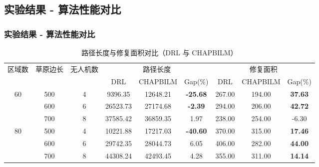 \documentclass[10pt, aspectratio=169]{beamer}  %
\begin{document}
\subsection{实验结果 - 算法性能对比}
\begin{frame}
	\frametitle{实验结果 - 算法性能对比}
	\begin{table}
		\centering
		\caption{路径长度与修复面积对比（DRL 与 CHAPBILM）}
		\small %
		\setlength{\tabcolsep}{3pt}
		\begin{tabular}{ccc ccc ccc}
			\toprule
			\multirow{2}{*}{区域数} & \multirow{2}{*}{草原边长} & \multirow{2}{*}{ 无人机数} & \multicolumn{3}{c}{路径长度} & \multicolumn{3}{c}{修复面积}                                                        \\
			\cmidrule(lr){4-6}\cmidrule(lr){7-9}
			                     &                       &                        & DRL                      & CHAPBILM                 & Gap(\%)         & DRL    & CHAPBILM & Gap(\%)        \\
			\midrule
			\multirow{3}{*}{60}
			                     & 500                   & 4                      & 9396.35                  & 12648.21                 & \textbf{-25.68} & 267.00 & 194.00   & \textbf{37.63} \\
			                     & 600                   & 6                      & 26523.73                 & 27174.68                 & \textbf{-2.39}  & 294.00 & 206.00   & \textbf{42.72} \\
			                     & 700                   & 8                      & 37585.42                 & 36859.35                 & 1.97            & 238.00 & 254.00   & -6.30          \\
			\midrule
			\multirow{3}{*}{80}
			                     & 500                   & 4                      & 10221.88                 & 17217.03                 & \textbf{-40.60} & 370.00 & 315.00   & \textbf{17.46} \\
			                     & 600                   & 6                      & 29742.35                 & 28044.73                 & 6.05            & 406.00 & 282.00   & \textbf{44.00} \\
			                     & 700                   & 8                      & 44308.24                 & 42493.45                 & 4.28            & 355.00 & 311.00   & \textbf{14.14} \\
			\bottomrule
		\end{tabular}
		\label{tab:combined_comparison}
	\end{table}
\end{frame}
\end{document}
